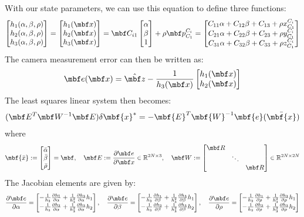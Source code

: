 \documentclass[10pt,letterpaper,fleqn,oneside]{article}
\newcommand{\Real}{\mathbb R}
\newcommand{\bbm}{\begin{bmatrix}}
\newcommand{\ebm}{\end{bmatrix}}
\begin{document}
With our state parameters, we can use this equation to define three functions:
\begin{align}
\bbm h_1 (\alpha, \beta, \rho) \\ h_2 (\alpha, \beta, \rho) \\ h_3 (\alpha, \beta, \rho) \ebm = \bbm h_1 (\mbf x) \\ h_2 (\mbf x) \\ h_3 (\mbf x) \ebm = \mbf C_{i1} \bbm \alpha \\ \beta \\ 1 \ebm + \rho  \mbf p^{C_i}_{C_1} = \bbm C_{11} \alpha + C_{12} \beta + C_{13} + \rho x^{C_i}_{C_1} \\ C_{21} \alpha + C_{22} \beta + C_{23} + \rho y^{C_i}_{C_1} \\ C_{31} \alpha + C_{32} \beta + C_{33} + \rho z^{C_i}_{C_1}   \ebm 
\end{align}
The camera measurement error can then be written as:
\begin{align}
\mbf e(\mbf x) = \hat{\mbf z} - \frac{1}{h_3 (\mbf x) } \bbm h_1 (\mbf x) \\ h_2 (\mbf x) \ebm
\end{align}
The least squares linear system then becomes:
\begin{align}
(\mbf  E^T \mbf W ^{-1} \mbf E ) \delta \mbf{x}^*  = - \mbf{E}^T\mbf{W}^{-1}\mbf{e}(\bar{\mbf{x}})
\end{align}
where
\begin{align}
\mbf{\bar{x}} := \bbm \bar{\alpha} \\ \bar{\beta} \\ \bar{\rho} \ebm = \mbf, \quad \mbf E := \frac{\partial \mbf e}{\partial \mbf x} \in \Real^{2 N \times 3 }, \quad \mbf W := \bbm \mbf R & & \\ & \ddots & \\ & & \mbf R \ebm \in \Real^{2 N \times 2 N}
\end{align}
The Jacobian elements are given by:
\begin{align}
\frac{\partial \mbf e}{\partial \alpha} = \bbm -\frac{1}{h_3} \frac{\partial h_1}{\partial \alpha} + \frac{1}{h_3^2} \frac{\partial h_3}{\partial \alpha} h_1 \\ -\frac{1}{h_3} \frac{\partial h_2}{\partial \alpha} + \frac{1}{h_3^2} \frac{\partial h_3}{\partial \alpha} h_2 \ebm, \quad
\frac{\partial \mbf e}{\partial \beta} = \bbm -\frac{1}{h_3} \frac{\partial h_1}{\partial \beta} + \frac{1}{h_3^2} \frac{\partial h_3}{\partial \beta} h_1 \\ -\frac{1}{h_3} \frac{\partial h_2}{\partial \beta} + \frac{1}{h_3^2} \frac{\partial h_3}{\partial \beta} h_2 \ebm, \quad
\frac{\partial \mbf e}{\partial \rho} = \bbm -\frac{1}{h_3} \frac{\partial h_1}{\partial \rho} + \frac{1}{h_3^2} \frac{\partial h_3}{\partial \rho} h_1 \\ -\frac{1}{h_3} \frac{\partial h_2}{\partial \rho} + \frac{1}{h_3^2} \frac{\partial h_3}{\partial \rho} h_2 \ebm
\end{align}
\end{document}
